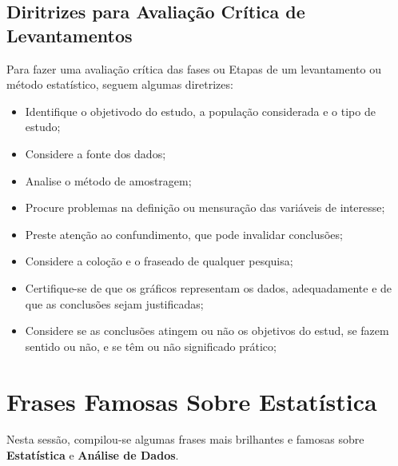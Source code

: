 \subsection{Diritrizes para Avaliação Crítica de Levantamentos}

Para  fazer uma avaliação crítica das fases ou Etapas de um levantamento ou método estatístico, seguem algumas diretrizes:

\begin{itemize}
    \item Identifique o objetivodo do estudo, a população considerada e o tipo de estudo;
    \item Considere a fonte dos dados;
    \item Analise o método de amostragem;
    \item Procure problemas na definição ou mensuração das variáveis de interesse;
    \item Preste atenção ao confundimento, que pode invalidar conclusões;
    \item Considere a coloção e o fraseado de qualquer pesquisa;
    \item Certifique-se de que os gráficos representam os dados, adequadamente e de que as conclusões sejam justificadas;
    \item Considere se as conclusões atingem ou não os objetivos do estud, se fazem sentido ou não, e se têm ou não significado prático;
\end{itemize}




\section{Frases Famosas Sobre Estatística}

Nesta sessão, compilou-se algumas frases mais brilhantes e famosas sobre \textbf{Estatística} e \textbf{Análise de Dados}.

